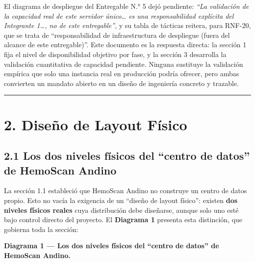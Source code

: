 \documentclass[11pt,a4paper]{article}
\begin{document}
El diagrama de despliegue del Entregable N.° 5 dejó pendiente: \emph{``La validación de la capacidad real de este servidor único\ldots{} es una responsabilidad explícita del Integrante 1\ldots, no de este entregable''}, y su tabla de tácticas reitera, para RNF-20, que se trata de ``responsabilidad de infraestructura de despliegue (fuera del alcance de este entregable)''. Este documento es la respuesta directa: la sección 1 fija el nivel de disponibilidad objetivo por fase, y la sección 3 desarrolla la validación cuantitativa de capacidad pendiente. Ninguna sustituye la validación empírica que solo una instancia real en producción podría ofrecer, pero ambas convierten un mandato abierto en un diseño de ingeniería concreto y trazable.

\begin{center}\rule{0.5\linewidth}{0.5pt}\end{center}

\section{2. Diseño de Layout Físico}\label{diseuxf1o-de-layout-fuxedsico}

\subsection{2.1 Los dos niveles físicos del ``centro de datos'' de HemoScan Andino}\label{los-dos-niveles-fuxedsicos-del-centro-de-datos-de-hemoscan-andino}

La sección 1.1 estableció que HemoScan Andino no construye un centro de datos propio. Esto no vacía la exigencia de un ``diseño de layout físico'': existen \textbf{dos niveles físicos reales} cuya distribución debe diseñarse, aunque solo uno esté bajo control directo del proyecto. El \textbf{Diagrama 1} presenta esta distinción, que gobierna toda la sección:

\textbf{Diagrama 1 --- Los dos niveles físicos del ``centro de datos'' de HemoScan Andino.}
\end{document}
